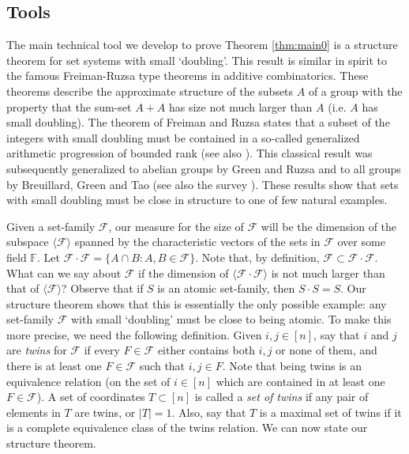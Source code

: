 	\subsection{Tools}
	
	The main technical tool we develop to prove Theorem \ref{thm:main0} is a structure theorem for set systems with small `doubling'. This result is similar in spirit to the famous Freiman-Ruzsa type theorems in additive combinatorics. These theorems describe the approximate structure of the subsets $A$ of a group with the property that the sum-set $A + A$ has size not much larger than $A$ (i.e. $A$ has small doubling). The theorem of Freiman and Ruzsa \cite{Freiman,Ruzsa} states that a subset of the integers with small doubling must be contained in a so-called generalized arithmetic progression of bounded rank (see also \cite{TV}). This classical result was subsequently generalized to abelian groups by Green and Ruzsa \cite{GR07} and to all groups by Breuillard, Green and Tao \cite{BGT12} (see also the survey \cite{BGT_Survey}). These results show that sets with small doubling must be close in structure to one of few natural examples. 
	
	Given a set-family $\mathcal{F}$, our measure for the size of $\mathcal{F}$ will be the dimension of the subspace $\langle \mathcal{F} \rangle$ spanned by the characteristic vectors of the sets in $\mathcal{F}$ over some field $\mathbb{F}$. 
	Let $\mathcal{F}\cdot\mathcal{F}=\{A\cap B:A,B\in\mathcal{F}\}$. Note that, by definition, $\mathcal{F} \subset \mathcal{F} \cdot \mathcal{F}$. 
	What can we say about $\mathcal{F}$ if the dimension of $\langle \mathcal{F} \cdot \mathcal{F} \rangle$ is not much larger than that of $\langle \mathcal{F} \rangle$? Observe that if $S$ is an atomic set-family, then $S \cdot S = S$.
	Our structure theorem shows that this is essentially the only possible example: any set-family $\mathcal{F}$ with small `doubling' must be close to being atomic. To make this more precise, we need the following definition. Given $i,j\in [n]$, say that $i$ and $j$ are {\em twins} for $\mathcal{F}$ if every $F \in \mathcal{F}$ either contains both $i,j$ or none of them, and there is at least one $F \in \mathcal{F}$ such that $i,j \in F$. Note that being twins is an equivalence relation (on the set of $i \in [n]$ which are contained in at least one $F \in \mathcal{F}$). A set of coordinates $T\subset [n]$ is called a \emph{set of twins} if any pair of elements in $T$ are twins, or $|T|=1$. Also, say that $T$ is a maximal set of twins if it is a complete equivalence class of the twins relation. We can now state our structure theorem. 
	
